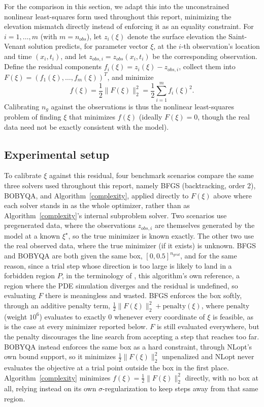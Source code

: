 \documentclass[11pt]{article}
\begin{document}
For the comparison in this section, we adapt this into the unconstrained
nonlinear least-squares form used throughout this report, minimizing the
elevation mismatch directly instead of enforcing it as an equality
constraint. For $i = 1, \ldots, m$ (with $m = n_{obs}$), let
$z_i(\xi)$ denote the surface elevation the Saint-Venant solution
predicts, for parameter vector $\xi$, at the $i$-th observation's
location and time $(x_i, t_i)$, and let $z_{obs,i} = z_{obs}(x_i, t_i)$
be the corresponding observation. Define the residual components
$f_i(\xi) = z_i(\xi) - z_{obs,i}$, collect them into $F(\xi) =
(f_1(\xi), \ldots, f_m(\xi))^T$, and minimize
\[
    f(\xi) = \frac12\|F(\xi)\|_2^2 = \frac12\sum_{i=1}^m f_i(\xi)^2.
\]
Calibrating $n_g$ against the observations is thus the nonlinear
least-squares problem of finding $\xi$ that minimizes $f(\xi)$
(ideally $F(\xi) = 0$, though the real data need not be exactly
consistent with the model).






\subsection{Experimental setup}
To calibrate $\xi$ against this residual, four benchmark scenarios
compare the same three solvers used throughout this report, namely BFGS
(backtracking, order 2), BOBYQA, and Algorithm~\ref{complexity}, applied
directly to $F(\xi)$ above where each solver stands in as the
whole optimizer, rather than as Algorithm~\ref{complexity}'s internal
subproblem solver. Two scenarios use pregenerated data, where the
observations $z_{obs,i}$ are themselves generated by the model at a known
$\xi^\star$, so the true minimizer is known exactly. The other two use
the real observed data, where the true minimizer (if it exists) is
unknown. BFGS and BOBYQA are both given the same box, $[0,0.5]^{n_{grid}}$,
and for the same reason, since a trial step whose direction is too large
is likely to land in a forbidden region $P$, in the terminology of
\cite{FortunatoMartinez2025}, this algorithm's own reference, a region
where the PDE simulation diverges and the residual is undefined, so
evaluating $F$ there is meaningless and wasted. BFGS enforces the box softly,
through an additive penalty term, $\frac12\|F(\xi)\|_2^2 +
\mathrm{penalty}(\xi)$, where $\mathrm{penalty}$ (weight $10^6$)
evaluates to exactly $0$ whenever every coordinate of $\xi$ is feasible,
as is the case at every minimizer reported below. $F$ is still evaluated
everywhere, but the penalty discourages the line search from accepting
a step that reaches too far. BOBYQA instead enforces the same box as a
hard constraint, through NLopt's own bound support, so it minimizes
$\frac12\|F(\xi)\|_2^2$ unpenalized and NLopt never evaluates the
objective at a trial point outside the box in the first place.
Algorithm~\ref{complexity}
minimizes $f(\xi) = \frac12\|F(\xi)\|_2^2$ directly, with no box at all,
relying instead on its own $\sigma$-regularization to keep steps away
from that same region.
\end{document}

